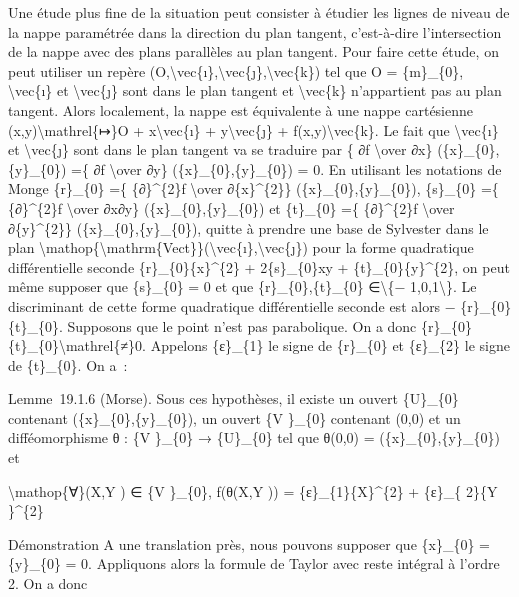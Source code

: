 \documentclass[]{article}
\begin{document}
Une étude plus fine de la situation peut consister à étudier les lignes
de niveau de la nappe paramétrée dans la direction du plan tangent,
c'est-à-dire l'intersection de la nappe avec des plans parallèles au
plan tangent. Pour faire cette étude, on peut utiliser un repère
(O,\textbackslash{}vec\{ı\},\textbackslash{}vec\{ȷ\},\textbackslash{}vec\{k\})
tel que O = \{m\}\_\{0\}, \textbackslash{}vec\{ı\} et
\textbackslash{}vec\{ȷ\} sont dans le plan tangent et
\textbackslash{}vec\{k\} n'appartient pas au plan tangent. Alors
localement, la nappe est équivalente à une nappe cartésienne
(x,y)\textbackslash{}mathrel\{↦\}O + x\textbackslash{}vec\{ı\} +
y\textbackslash{}vec\{ȷ\} + f(x,y)\textbackslash{}vec\{k\}. Le fait que
\textbackslash{}vec\{ı\} et \textbackslash{}vec\{ȷ\} sont dans le plan
tangent va se traduire par \{ ∂f \textbackslash{}over ∂x\}
(\{x\}\_\{0\},\{y\}\_\{0\}) =\{ ∂f \textbackslash{}over ∂y\}
(\{x\}\_\{0\},\{y\}\_\{0\}) = 0. En utilisant les notations de Monge
\{r\}\_\{0\} =\{ \{∂\}\^{}\{2\}f \textbackslash{}over ∂\{x\}\^{}\{2\}\}
(\{x\}\_\{0\},\{y\}\_\{0\}), \{s\}\_\{0\} =\{ \{∂\}\^{}\{2\}f
\textbackslash{}over ∂x∂y\} (\{x\}\_\{0\},\{y\}\_\{0\}) et \{t\}\_\{0\}
=\{ \{∂\}\^{}\{2\}f \textbackslash{}over ∂\{y\}\^{}\{2\}\}
(\{x\}\_\{0\},\{y\}\_\{0\}), quitte à prendre une base de Sylvester dans
le plan
\textbackslash{}mathop\{\textbackslash{}mathrm\{Vect\}\}(\textbackslash{}vec\{ı\},\textbackslash{}vec\{ȷ\})
pour la forme quadratique différentielle seconde
\{r\}\_\{0\}\{x\}\^{}\{2\} + 2\{s\}\_\{0\}xy +
\{t\}\_\{0\}\{y\}\^{}\{2\}, on peut même supposer que \{s\}\_\{0\} = 0
et que \{r\}\_\{0\},\{t\}\_\{0\} ∈\textbackslash{}\{−
1,0,1\textbackslash{}\}. Le discriminant de cette forme quadratique
différentielle seconde est alors − \{r\}\_\{0\}\{t\}\_\{0\}. Supposons
que le point n'est pas parabolique. On a donc
\{r\}\_\{0\}\{t\}\_\{0\}\textbackslash{}mathrel\{≠\}0. Appelons
\{ε\}\_\{1\} le signe de \{r\}\_\{0\} et \{ε\}\_\{2\} le signe de
\{t\}\_\{0\}. On a~:

Lemme~19.1.6 (Morse). Sous ces hypothèses, il existe un ouvert
\{U\}\_\{0\} contenant (\{x\}\_\{0\},\{y\}\_\{0\}), un ouvert \{V
\}\_\{0\} contenant (0,0) et un difféomorphisme θ : \{V \}\_\{0\} →
\{U\}\_\{0\} tel que θ(0,0) = (\{x\}\_\{0\},\{y\}\_\{0\}) et

\textbackslash{}mathop\{∀\}(X,Y ) ∈ \{V \}\_\{0\}, f(θ(X,Y )) =
\{ε\}\_\{1\}\{X\}\^{}\{2\} + \{ε\}\_\{ 2\}\{Y \}\^{}\{2\}

Démonstration A une translation près, nous pouvons supposer que
\{x\}\_\{0\} = \{y\}\_\{0\} = 0. Appliquons alors la formule de Taylor
avec reste intégral à l'ordre 2. On a donc
\end{document}
